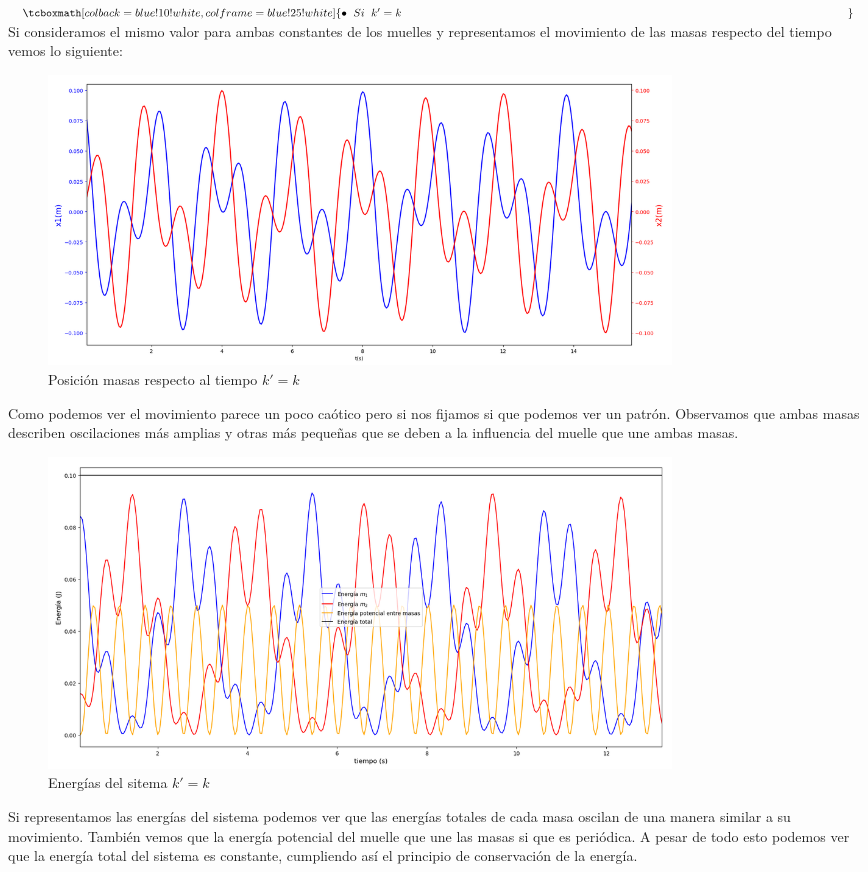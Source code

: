 \documentclass{article}
\begin{document}
\noindent$\tcboxmath[colback=blue!10!white,colframe=blue!25!white]{\bullet\hspace{0.2cm}Si \hspace{0.2cm}k'=k\hspace{14cm}}\label{ec.:4}$\newline\linebreak
Si consideramos el mismo valor para ambas constantes de los muelles y representamos el movimiento de las masas respecto del tiempo vemos lo siguiente:
\begin{figure}[H]
    \centering
    \includegraphics[width=0.8\textwidth]{posicion_k_iguales}
\caption{Posición masas respecto al tiempo $k'=k$}
\label{fig:1}
\end{figure}
Como podemos ver el movimiento parece un poco caótico pero si nos fijamos si que podemos ver un patrón. Observamos que ambas masas describen oscilaciones más amplias y otras más pequeñas que se deben a la influencia del muelle que une ambas masas. 
\begin{figure}[H]
    \centering
    \includegraphics[width=0.8\textwidth]{energias_k_iguales}
\caption{Energías del sitema $k'=k$}
\label{fig:2}
\end{figure}
Si representamos las energías del sistema podemos ver que las energías totales de cada masa oscilan de una manera similar a su movimiento. También vemos que la energía potencial del muelle que une las masas si que es periódica. A pesar de todo esto podemos ver que la energía total del sistema es constante, cumpliendo así el principio de conservación de la energía.\newline\linebreak
\end{document}
